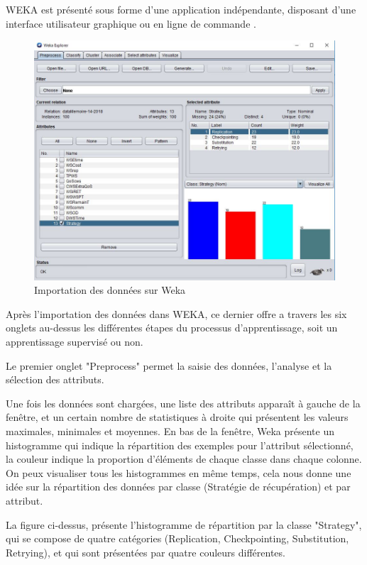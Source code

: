 WEKA est présenté sous forme d’une application indépendante, disposant d’une interface utilisateur graphique ou en ligne de commande \cite{9}.


\begin{figure}[H]
\begin{center}
\includegraphics[width=1\linewidth]{images/weka1.JPG}
\end{center}
\caption{Importation des données sur Weka}
\label{fig:13}
\end{figure}

Après l'importation des données dans WEKA, ce dernier offre a travers les six onglets au-dessus les différentes étapes du processus d'apprentissage, soit un apprentissage supervisé ou non. 

Le premier onglet "Preprocess" permet la saisie des données, l'analyse et la sélection des attributs. 

Une fois les données sont chargées, une liste des attributs apparaît à gauche de la fenêtre, et un certain nombre de statistiques à droite qui présentent les valeurs maximales, minimales et moyennes.
En bas de la fenêtre, Weka présente un histogramme qui indique la répartition des exemples pour l'attribut sélectionné, la couleur indique la proportion d’éléments de chaque classe dans chaque colonne. On peux visualiser tous les histogrammes en même temps, cela nous donne une idée sur la répartition des données par classe (Stratégie de récupération) et par attribut. 

La figure ci-dessus, présente l'histogramme de répartition par la classe "Strategy", qui se compose de quatre catégories (Replication, Checkpointing, Substitution, Retrying), et qui sont présentées par quatre couleurs différentes. 

